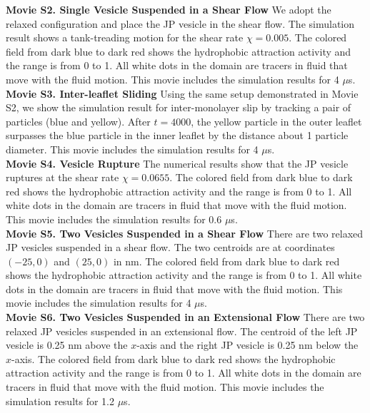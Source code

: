 \noindent
{\bf Movie S2. Single Vesicle Suspended in a Shear Flow} 
We adopt the relaxed configuration and place the JP vesicle in the shear flow. The simulation result shows a tank-treading motion for the shear rate $\chi=0.005$.
The colored field from dark blue to dark red shows the hydrophobic attraction activity and the range is from 0 to 1. All white dots in the domain are tracers in fluid that move with the fluid motion.
This movie includes the simulation results for 4 $\mu$s.\\ %

\noindent
{\bf Movie S3. Inter-leaflet Sliding} 
Using the same setup demonstrated in Movie S2, we show the simulation result for 
inter-monolayer slip by tracking a pair of particles (blue and yellow). After $t=4000$, 
the yellow particle in the outer leaflet surpasses the blue particle in the inner leaflet by the distance about 1 particle diameter.
This movie includes the simulation results for 4 $\mu$s.\\ %


\noindent
{\bf Movie S4. Vesicle Rupture} 
The numerical results show that the JP vesicle ruptures at the shear rate $\chi=0.0655$. The colored field from dark blue to dark red shows the hydrophobic attraction activity and the range is from 0 to 1. All white dots in the domain are tracers in fluid that move with the fluid motion. This movie includes the simulation results for 0.6 $\mu$s.\\ %


\noindent
{\bf Movie S5. Two Vesicles Suspended in a Shear Flow} 
There are two relaxed JP vesicles suspended in a shear flow. The two centroids are at coordinates $(-25,0)$ and $(25,0)$ in nm. The colored field from dark blue to dark red shows the hydrophobic attraction activity and the range is from 0 to 1. All white dots in the domain are tracers in fluid that move with the fluid motion. This movie includes the simulation results for 4 $\mu$s.\\ %


\noindent
{\bf Movie S6. Two Vesicles Suspended in an Extensional Flow} 
There are two relaxed JP vesicles suspended in an extensional flow. The centroid of the left JP vesicle is 0.25 nm above the $x$-axis and the right JP vesicle is 0.25 nm below the $x$-axis. The colored field from dark blue to dark red shows the hydrophobic attraction activity and the range is from 0 to 1. All white dots in the domain are tracers in fluid that move with the fluid motion.
This movie includes the simulation results for 1.2 $\mu$s.\\ %


